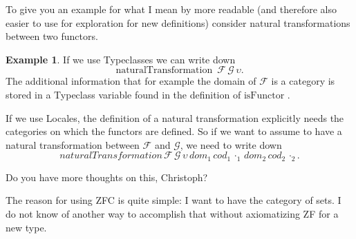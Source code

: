 \documentclass[a4paper, 11pt]{article}
\theoremstyle{definition}
\newtheorem{example}{Example}
\newcommand{\notion}[1]{\text{#1 }}
\begin{document}
To give you an example for what I mean by more readable (and therefore also easier to use for exploration for new definitions) consider natural transformations between two functors.
\begin{example}
	If we use Typeclasses we can write down \[ \notion{naturalTransformation} \, \mathcal{F} \, \mathcal{G} \, \upsilon. \] The additional information that for example the domain of $\mathcal{F}$ is a category is stored in a Typeclass variable found in the definition of $\notion{isFunctor}$. 
	
	If we use Locales, the definition of a natural transformation explicitly needs the categories on which the functors are defined. So if we want to assume to have a natural transformation between $\mathcal{F}$ and $\mathcal{G}$, we need to write down
	\[ naturalTransformation \, \mathcal{F} \, \mathcal{G} \, \upsilon \, dom_1 \, cod_1 \, \cdot_1 \, dom_2 \, cod_2 \, \cdot_2. \]
\end{example}

\noindent Do you have more thoughts on this, Christoph?

\medskip

\noindent The reason for using ZFC is quite simple: I want to have the category of sets. I do not know of another way to accomplish that without axiomatizing ZF for a new type. 
\end{document}

